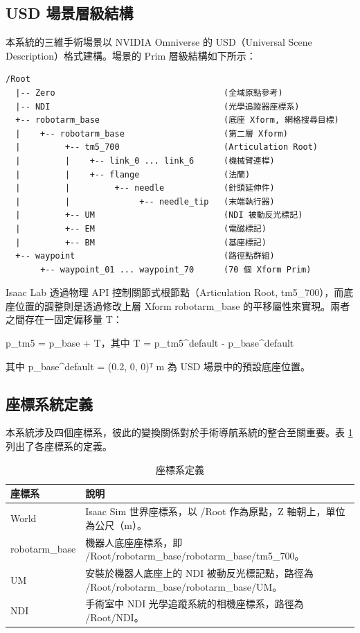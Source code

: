 \documentclass[a4paper, 12pt]{article}
\begin{document}
\subsection{USD 場景層級結構}

本系統的三維手術場景以 NVIDIA Omniverse 的 USD（Universal Scene Description）格式建構。場景的 Prim 層級結構如下所示：

\begin{verbatim}
/Root
  |-- Zero                                  (全域原點參考)
  |-- NDI                                   (光學追蹤器座標系)
  +-- robotarm_base                         (底座 Xform, 網格搜尋目標)
  |    +-- robotarm_base                    (第二層 Xform)
  |         +-- tm5_700                     (Articulation Root)
  |         |    +-- link_0 ... link_6      (機械臂連桿)
  |         |    +-- flange                 (法蘭)
  |         |         +-- needle            (針頭延伸件)
  |         |              +-- needle_tip   (末端執行器)
  |         +-- UM                          (NDI 被動反光標記)
  |         +-- EM                          (電磁標記)
  |         +-- BM                          (基座標記)
  +-- waypoint                              (路徑點群組)
       +-- waypoint_01 ... waypoint_70      (70 個 Xform Prim)
\end{verbatim}

Isaac Lab 透過物理 API 控制關節式根節點（Articulation Root, tm5\_700），而底座位置的調整則是透過修改上層 Xform robotarm\_base 的平移屬性來實現。兩者之間存在一固定偏移量 T：
\begin{center}
p\_tm5 = p\_base + T，其中 T = p\_tm5\^{}default - p\_base\^{}default
\end{center}
其中 p\_base\^{}default = (0.2, 0, 0)ᵀ m 為 USD 場景中的預設底座位置。

\subsection{座標系統定義}
\label{subsec:coordinate}

本系統涉及四個座標系，彼此的變換關係對於手術導航系統的整合至關重要。表 \ref{tab:frames} 列出了各座標系的定義。

\begin{table}[H]
\centering
\caption{座標系定義}
\label{tab:frames}
\begin{tabularx}{\textwidth}{l X}
\toprule
\textbf{座標系} & \textbf{說明} \\
\midrule
World & Isaac Sim 世界座標系，以 /Root 作為原點，Z 軸朝上，單位為公尺（m）。 \\
robotarm\_base & 機器人底座座標系，即 /Root/robotarm\_base/robotarm\_base/tm5\_700。 \\
UM & 安裝於機器人底座上的 NDI 被動反光標記點，路徑為 /Root/robotarm\_base/robotarm\_base/UM。 \\
NDI & 手術室中 NDI 光學追蹤系統的相機座標系，路徑為 /Root/NDI。 \\
\bottomrule
\end{tabularx}
\end{table}
\end{document}
